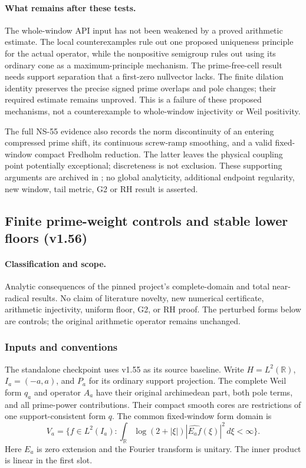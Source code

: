 \documentclass[11pt]{article}
\theoremstyle{remark}
\begin{document}
\paragraph{What remains after these tests.}
The whole-window API input has not been weakened by a proved arithmetic
estimate. The local counterexamples rule out one proposed uniqueness
principle for the actual operator, while the nonpositive semigroup rules
out using its ordinary cone as a maximum-principle mechanism. The
prime-free-cell result needs support separation that a first-zero
nullvector lacks. The finite dilation identity preserves the precise
signed prime overlaps and pole changes; their required estimate remains
unproved. This is a failure of these proposed mechanisms, not a
counterexample to whole-window injectivity or Weil positivity.

The full NS-55 evidence also records the norm discontinuity of an
entering compressed prime shift, its continuous screw-ramp smoothing,
and a valid fixed-window compact Fredholm reduction. The latter leaves
the physical coupling point potentially exceptional; discreteness is
not exclusion. These supporting arguments are archived in
; no global analyticity, additional endpoint
regularity, new window, tail metric, G2 or RH result is asserted.

\subsection{Finite prime-weight controls and stable lower floors (v1.56)}
\label{sec:v156-prime-weight-controls}

\paragraph{Classification and scope.} Analytic consequences of the pinned project's complete-domain
and total near-radical results. No claim of literature novelty, new numerical
certificate, arithmetic injectivity, uniform floor, G2, or RH proof.
The perturbed forms below are controls; the original arithmetic operator remains unchanged.

\subsubsection{Inputs and conventions}
The standalone checkpoint uses v1.55 as its source baseline.
Write $H=L^2(\mathbb R)$, $I_a=(-a,a)$, and $P_a$ for its ordinary support projection.
The complete Weil form $q_a$ and operator $A_a$ have their original
archimedean part, both pole terms, and all prime-power contributions.
Their compact smooth cores are restrictions of one support-consistent form $q$.
The common fixed-window form domain is
\[
 V_a=\{f\in L^2(I_a):\int_\mathbb R\log(2+|\xi|)
           |\widehat{E_af}(\xi)|^2\,d\xi<\infty\}.
\]
Here $E_a$ is zero extension and the Fourier transform is unitary.
The inner product is linear in the first slot.
\end{document}
